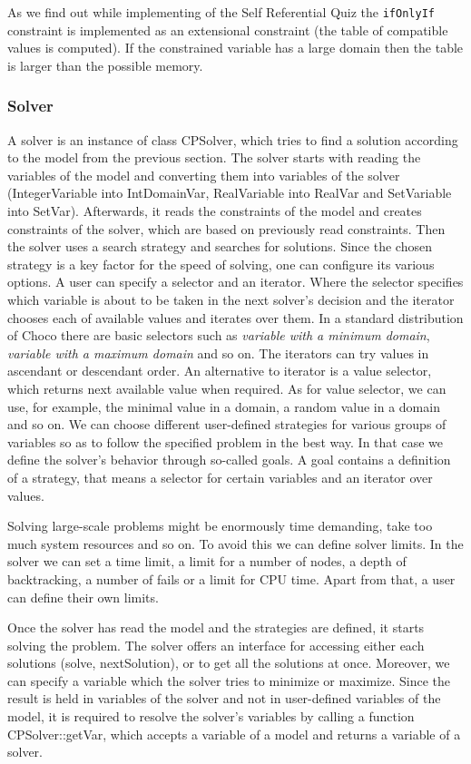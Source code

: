 As we find out while implementing of the Self Referential Quiz the \texttt{ifOnlyIf} constraint
is implemented as an extensional constraint (the table of compatible values is computed).
If the constrained variable has a large domain then the table is larger than
the possible memory.

\subsubsection{Solver}
A solver is an instance of class CPSolver, which tries to find a solution according to the model
from the previous section. The solver starts with reading the variables of the model and 
converting them into variables of the solver (IntegerVariable into IntDomainVar, RealVariable into RealVar and SetVariable into SetVar).
Afterwards, it reads the constraints of the model and creates constraints of the solver, which are based on previously read constraints.
Then the solver uses a search strategy and searches for solutions. Since the chosen strategy
is a key factor for the speed of solving, one can configure its various options.
A user can specify a selector and an iterator. Where the selector specifies which variable
is about to be taken in the next solver's decision and the iterator chooses each of available values
and iterates over them. In a standard distribution of Choco there are basic selectors such as 
{\em variable with a minimum domain}, {\em variable with a maximum domain} and so on. 
The iterators can try values in ascendant or descendant order. An alternative to iterator
is a value selector, which returns next available value when required. As for value selector,
we can use, for example, the minimal value in a domain, a random value in a domain and so on. We can choose
different user-defined strategies for various groups of variables so as to follow the specified problem
in the best way. In that case we define the solver's behavior through so-called goals. A goal
contains a definition of a strategy, that means a selector for certain variables and an iterator over values.

Solving large-scale problems might be enormously time demanding, take too much system resources and so on.
To avoid this we can define solver limits. In the solver we can set a time limit, a limit for a number of nodes, 
a depth of backtracking, a number of fails or a limit for CPU time. Apart from that, a user can define their own limits. 

Once the solver has read the model and the strategies are defined, it starts solving the problem.
The solver offers an interface for accessing either each solutions (solve, nextSolution), or to get
all the solutions at once. Moreover, we can specify a variable which the solver tries to minimize or maximize.
Since the result is held in variables of the solver and not in user-defined variables of the model,
it is required to resolve the solver's variables by calling a function CPSolver::getVar, which accepts a variable of a model
and returns a variable of a solver.

